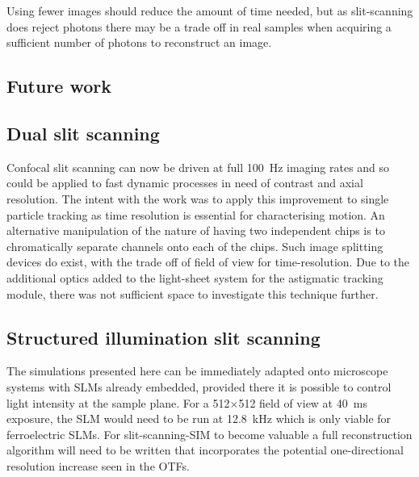 Using fewer images should reduce the amount of time needed, but as slit-scanning does reject photons there may be a trade off in real samples when acquiring a sufficient number of photons to reconstruct an image.

\subsection{Future work}

\subsection{Dual slit scanning}

Confocal slit scanning can now be driven at full \SI{100}{\hertz} imaging rates and so could be applied to fast dynamic processes in need of contrast and axial resolution.
The intent with the work was to apply this improvement to single particle tracking as time resolution is essential for characterising motion.
An alternative manipulation of the nature of having two independent chips is to chromatically separate channels onto each of the chips.
Such image splitting devices do exist, with the trade off of field of view for time-resolution.
Due to the additional optics added to the light-sheet system for the astigmatic tracking module, there was not sufficient space to investigate this technique further.

\subsection{Structured illumination slit scanning}

The simulations presented here can be immediately adapted onto microscope systems with SLMs already embedded, provided there it is possible to control light intensity at the sample plane.
For a 512$\times$512 field of view at \SI{40}{\milli\second} exposure, the SLM would need to be run at \SI{12.8}{\kilo\hertz} which is only viable for ferroelectric SLMs.
For slit-scanning-SIM to become valuable a full reconstruction algorithm will need to be written that incorporates the potential one-directional resolution increase seen in the OTFs.








